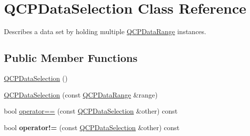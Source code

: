 \hypertarget{class_q_c_p_data_selection}{}\section{Q\+C\+P\+Data\+Selection Class Reference}
\label{class_q_c_p_data_selection}


Describes a data set by holding multiple \hyperlink{class_q_c_p_data_range}{Q\+C\+P\+Data\+Range} instances.  


\subsection*{Public Member Functions}
\begin{DoxyCompactItemize}
\item 
\hyperlink{class_q_c_p_data_selection_a0e0b7faaec7df1a7c77dd6f4883cdf0d}{Q\+C\+P\+Data\+Selection} ()
\item 
\hyperlink{class_q_c_p_data_selection_a738dfb4f5718c5df5ed35ea33ac37818}{Q\+C\+P\+Data\+Selection} (const \hyperlink{class_q_c_p_data_range}{Q\+C\+P\+Data\+Range} \&range)
\item 
bool \hyperlink{class_q_c_p_data_selection_a2489ba93bca3f4f5dc5951eff7d84300}{operator==} (const \hyperlink{class_q_c_p_data_selection}{Q\+C\+P\+Data\+Selection} \&other) const 
\item 
bool {\bfseries operator!=} (const \hyperlink{class_q_c_p_data_selection}{Q\+C\+P\+Data\+Selection} \&other) const \hypertarget{class_q_c_p_data_selection_afade4352fad85f165fa29797d5943330}{}\label{class_q_c_p_data_selection_afade4352fad85f165fa29797d5943330}


\end{DoxyCompactItemize}
